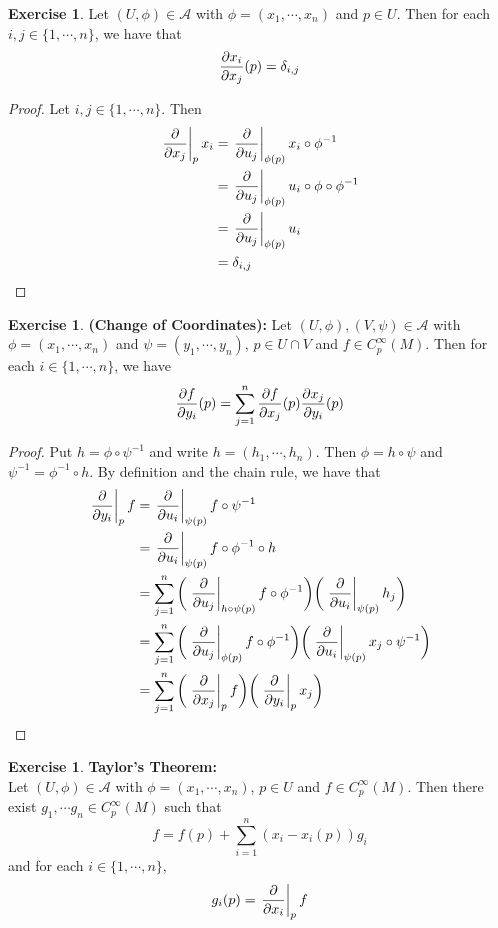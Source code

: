 \documentclass[12pt]{amsart}
\theoremstyle{definition}
\theoremstyle{definition}
\newtheorem{ex}[definition]{Exercise}
\newcommand{\del}{\delta}
\newcommand{\MA}{\mathcal{A}}
\begin{document}
	\begin{ex}
		Let $(U, \phi) \in \MA$ with $\phi = (x_1, \cdots, x_n)$ and $p \in U$. Then for each $i,j \in \{1, \cdots, n\}$, we have that $${\pdv{x_i}{x_j}}(p) = \del_{i,j}$$
	\end{ex}

	\begin{proof}
		Let $i,j \in \{1, \cdots, n\}$. Then 
		\begin{align*}
			\eval{\pdv{x_j}}_{p} x_i 
			&=  \eval{\pdv{u_j}}_{\phi(p)} x_i \circ \phi^{-1} \\
			&= \eval{\pdv{u_j}}_{\phi(p)} u_i \circ \phi \circ \phi^{-1} \\
			&= \eval{\pdv{u_j}}_{\phi(p)} u_i  \\
			&= \del_{i,j}
		\end{align*}
	\end{proof}

	\begin{ex} \textbf{(Change of Coordinates):}
		Let $(U, \phi), (V, \psi) \in \MA$ with $\phi = (x_1, \cdots, x_n)$ and $\psi = (y_1, \cdots, y_n)$, $p \in U \cap V$ and $f \in C_p^{\infty}(M)$. Then for each $i \in \{1, \cdots, n\}$, we have $${\pdv{f}{y_i}}(p) = \sum_{j =1}^n {\pdv{f}{x_j}}(p)   {\pdv{x_j}{y_i}}(p) $$
	\end{ex}

	\begin{proof}
		Put $h = \phi \circ \psi^{-1}$ and write $h = (h_1, \cdots, h_n)$. Then $\phi = h \circ \psi$ and $\psi^{-1} = \phi^{-1} \circ h$. By definition and the chain rule, we have that 
		\begin{align*}
		\eval{\pdv{y_i}}_{p} f 
			&= \eval{\pdv{u_i}}_{\psi(p)} f \circ \psi^{-1} \\
			&= \eval{\pdv{u_i}}_{\psi(p)} f \circ \phi^{-1} \circ h \\
			&= \sum_{j=1}^n \bigg( \eval{\pdv{u_j}}_{h \circ \psi (p)} f \circ \phi^{-1} \bigg)  \bigg( \eval{\pdv{u_i}}_{\psi(p)} h_j \bigg) \\
			&= \sum_{j=1}^n \bigg( \eval{\pdv{u_j}}_{\phi (p)} f \circ \phi^{-1}  \bigg) \bigg( \eval{\pdv{u_i}}_{\psi(p)} x_j \circ \psi^{-1} \bigg) \\
			&= \sum_{j=1}^n \bigg( \eval{\pdv{x_j}}_{p} f \bigg)  \bigg(   \eval{\pdv{y_i}}_{p} x_j  \bigg)\\
		\end{align*}
	\end{proof}

	\begin{ex}\textbf{Taylor's Theorem:}\\
		Let $(U, \phi) \in \MA$ with $\phi = (x_1, \cdots, x_n)$, $p \in U$ and $f \in C^{\infty}_p(M)$. Then there exist $g_1, \cdots g_n \in C_p^{\infty}(M)$ such that $$f = f(p) + \sum_{i=1}^n(x_i - x_i(p)) g_i$$ and for each $i \in \{1, \cdots, n\}$, $$g_i(p) = \eval{\pdv{x_i}}_{p} f $$ 
	\end{ex}
\end{document}
